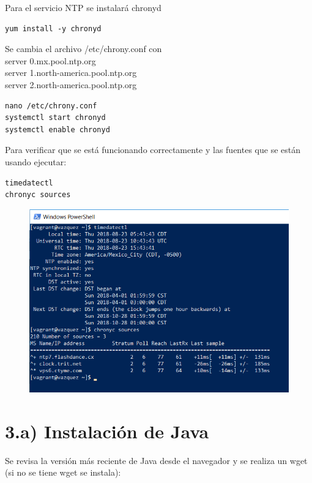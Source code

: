 \documentclass[]{article}
\begin{document}
Para el servicio NTP se instalará chronyd

\begin{verbatim}
yum install -y chronyd
\end{verbatim}

Se cambia el archivo /etc/chrony.conf con\\
server 0.mx.pool.ntp.org\\
server 1.north-america.pool.ntp.org\\
server 2.north-america.pool.ntp.org

\begin{verbatim}
nano /etc/chrony.conf
systemctl start chronyd
systemctl enable chronyd
\end{verbatim}

Para verificar que se está funcionando correctamente y las fuentes que
se están usando ejecutar:

\begin{verbatim}
timedatectl
chronyc sources 
\end{verbatim}

\begin{figure}[htbp]
\centering
\includegraphics{NTP.png}
\end{figure}

\section{3.a) Instalación de Java}\label{a-instalacion-de-java}

Se revisa la versión más reciente de Java desde el navegador y se
realiza un wget (si no se tiene wget se instala):
\end{document}
